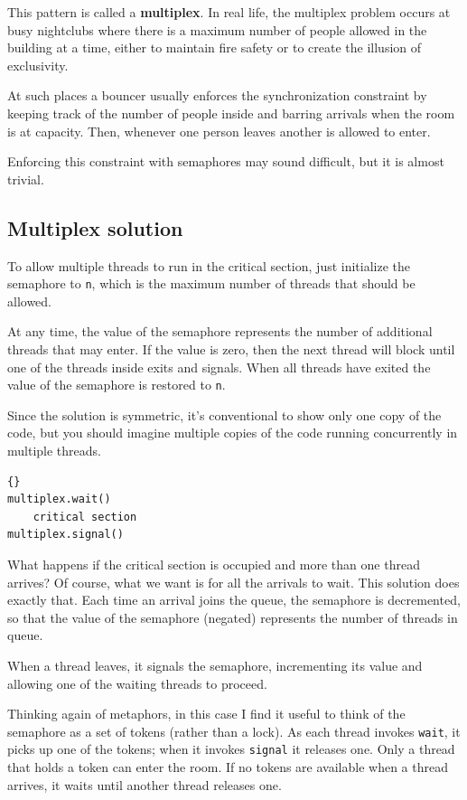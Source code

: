 \documentclass{book}
\begin{document}
This pattern is called a {\bf multiplex}.  In real life, the multiplex
problem occurs at busy nightclubs where there is a maximum number of
people allowed in the building at a time, either to maintain fire
safety or to create the illusion of exclusivity.

At such places a bouncer usually enforces the synchronization
constraint by keeping track of the number of people inside
and barring arrivals when the room is at capacity.  Then,
whenever one person leaves another is allowed to enter.

Enforcing this constraint with semaphores may sound difficult, but it
is almost trivial.



\subsection{Multiplex solution}

To allow multiple threads to run in the critical section, just
initialize the semaphore to {\tt n}, which is the maximum number
of threads that should be allowed.

At any time, the value of the semaphore represents the
number of additional threads that may enter.  If the value is zero,
then the next thread will block until one of the threads inside
exits and signals.  When all threads have exited the value of the
semaphore is restored to {\tt n}.

Since the solution is symmetric, it's conventional to show only one
copy of the code, but you should imagine multiple copies of the code
running concurrently in multiple threads.

\begin{lstlisting}[title={Multiplex solution}]{}
multiplex.wait()
    critical section 
multiplex.signal()      
\end{lstlisting}

What happens if the critical section is occupied and more than one
thread arrives?  Of course, what we want is for all the arrivals to
wait.  This solution does exactly that.  Each time an arrival joins
the queue, the semaphore is decremented, so that the value of the
semaphore (negated) represents the number of threads in queue.

When a thread leaves, it signals the semaphore, incrementing
its value and allowing one of the waiting threads to proceed.

Thinking again of metaphors, in this case I find it useful
to think of the semaphore as a set of tokens (rather than
a lock).
As each thread invokes {\tt wait}, it picks up one of
the tokens; when it invokes {\tt signal} it releases one.
Only a thread that holds a token can enter the room.  If no
tokens are available when a thread arrives, it waits until
another thread releases one.
\end{document}
